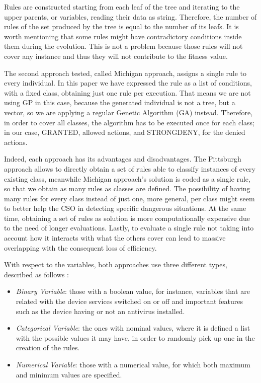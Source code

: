 \documentclass[runningheads]{llncs}
\begin{document}
Rules are constructed starting from each leaf of the tree and iterating to the upper parents, or variables, reading their data as string. Therefore, the number of rules of the set produced by the tree is equal to the number of its leafs. It is worth mentioning that some rules might have contradictory conditions inside them during the evolution. This is not a problem because those rules will not cover any instance and thus they will not contribute to the fitness value. 

The second approach tested, called Michigan approach, assigns a single
rule to every individual. In this paper we have expressed the rule as
a list of conditions, with a fixed class, obtaining just one rule per
execution. That means we are not using GP in this case, because the
generated individual is not a tree, but a vector, so we are applying a
regular Genetic Algorithm (GA) instead. Therefore, in order to cover
all classes, the algorithm has to be executed once for each class; in
our case, GRANTED, allowed actions, and STRONGDENY, for the denied
actions. 

Indeed, each approach has its advantages and disadvantages. The Pittsburgh approach allows to directly obtain a set of rules able to classify instances of every existing class, meanwhile Michigan approach's solution is coded as a single rule, so that we obtain as many rules as classes are defined. The possibility of having many rules for every class instead of just one, more general, per class might seem to better help the CSO in detecting specific dangerous situations.
At the same time, obtaining a set of rules as solution is more
computationally expensive due to the need of longer
evaluations. Lastly, to evaluate a single rule not taking into account
how it interacts with what the others cover \cite{freitas2002data}
can lead to massive overlapping with the consequent loss of
efficiency. 

With respect to the variables, both approaches use three different types, 
described as follows \cite{witten2005data}:

\begin{itemize}
\item {\em Binary Variable}: those with a boolean value, for instance, variables that are related with the device services switched on or off and important features such as the device having or not an antivirus installed. 
\item {\em Categorical Variable}: the ones with nominal values, where it is defined a list with the possible values it may have, in order to randomly pick up one in the creation of the rules. 
\item {\em Numerical Variable}: those with a numerical value, for which both maximum and minimum values are specified. 

\end{itemize}
\end{document}
